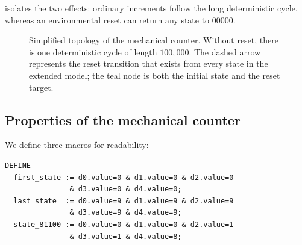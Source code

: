  isolates the two effects: ordinary increments
follow the long deterministic cycle, whereas an environmental reset can
return any state to \(00000\).

\begin{figure}[ht]
  \centering
  \caption{Simplified topology of the mechanical counter.  Without reset,
           there is one deterministic cycle of length $100{,}000$.  The
           dashed arrow represents the reset transition that exists from
           every state in the extended model; the teal node is both the
           initial state and the reset target.}
  \label{fig:mech-counter-graph}
\end{figure}

\subsection{Properties of the mechanical counter}
\label{sec:mech-counter-props}

We define three macros for readability:
\begin{verbatim}
DEFINE
  first_state := d0.value=0 & d1.value=0 & d2.value=0
               & d3.value=0 & d4.value=0;
  last_state  := d0.value=9 & d1.value=9 & d2.value=9
               & d3.value=9 & d4.value=9;
  state_81100 := d0.value=0 & d1.value=0 & d2.value=1
               & d3.value=1 & d4.value=8;
\end{verbatim}

